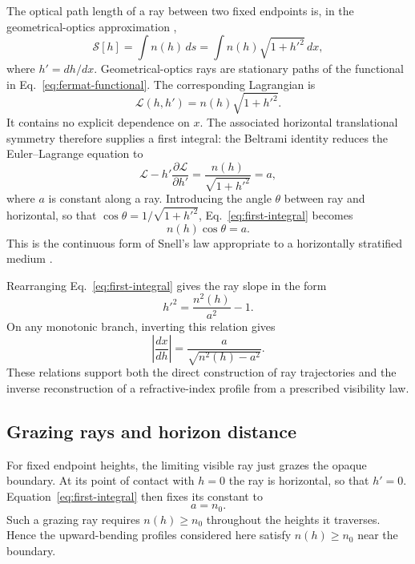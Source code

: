 The optical path length of a ray between two fixed endpoints is, in the
geometrical-optics approximation \cite{born1999principles},
\begin{equation}
    \mathcal{S}[h]
    =
    \int n(h)\,ds
    =
    \int n(h)\sqrt{1+h'^2}\,dx,
    \label{eq:fermat-functional}
\end{equation}
where $h'=dh/dx$. Geometrical-optics rays are stationary paths of
the functional in Eq.~\eqref{eq:fermat-functional}. The corresponding
Lagrangian is
\begin{equation}
    \mathcal{L}(h,h')=n(h)\sqrt{1+h'^2}.
\end{equation}
It contains no explicit dependence on $x$. The associated horizontal
translational symmetry therefore supplies a first integral: the Beltrami
identity reduces the Euler--Lagrange equation to
\begin{equation}
    \mathcal{L}
    -h'\frac{\partial\mathcal{L}}{\partial h'}
    =
    \frac{n(h)}{\sqrt{1+h'^2}}
    =a,
    \label{eq:first-integral}
\end{equation}
where $a$ is constant along a ray. Introducing the angle $\theta$ between
ray and horizontal, so that $\cos\theta=1/\sqrt{1+h'^2}$,
Eq.~\eqref{eq:first-integral} becomes
\begin{equation}
    n(h)\cos\theta=a.
\end{equation}
This is the continuous form of Snell's law appropriate to a horizontally
stratified medium \cite{schroeder2000astronomical,nener2003analytical}.

Rearranging Eq.~\eqref{eq:first-integral} gives the ray slope in the form
\begin{equation}
    h'^2
    =
    \frac{n^2(h)}{a^2}-1.
    \label{eq:ray-slope}
\end{equation}
On any monotonic branch, inverting this relation gives
\begin{equation}
    \left|\frac{dx}{dh}\right|
    =
    \frac{a}{\sqrt{n^2(h)-a^2}}.
    \label{eq:horizontal-increment-general}
\end{equation}
These relations support both the direct construction of ray trajectories and
the inverse reconstruction of a refractive-index profile from a prescribed
visibility law.

\subsection{Grazing rays and horizon distance}

For fixed endpoint heights, the limiting visible ray just grazes the opaque
boundary. At its point of contact with $h=0$ the ray is
horizontal, so that $h'=0$. Equation~\eqref{eq:first-integral} then fixes its
constant to
\begin{equation}
    a=n_0.
    \label{eq:grazing-constant}
\end{equation}
Such a grazing ray requires $n(h)\geq n_0$ throughout the heights it
traverses. Hence the upward-bending profiles considered here satisfy
$n(h)\geq n_0$ near the boundary.

